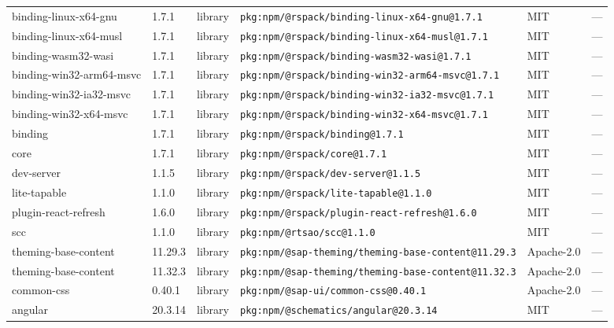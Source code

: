 \documentclass[11pt,a4paper]{article}
\begin{document}
\begin{longtable}{|p{4cm}|p{2cm}|p{1.6cm}|p{5cm}|p{1.5cm}|p{3.5cm}|}
\raggedright binding-linux-x64-gnu & 1.7.1 & library & \small\texttt{pkg:npm/@rspack/binding-linux-x64-gnu@1.7.1} & MIT & \small — \\
\raggedright binding-linux-x64-musl & 1.7.1 & library & \small\texttt{pkg:npm/@rspack/binding-linux-x64-musl@1.7.1} & MIT & \small — \\
\raggedright binding-wasm32-wasi & 1.7.1 & library & \small\texttt{pkg:npm/@rspack/binding-wasm32-wasi@1.7.1} & MIT & \small — \\
\raggedright binding-win32-arm64-msvc & 1.7.1 & library & \small\texttt{pkg:npm/@rspack/binding-win32-arm64-msvc@1.7.1} & MIT & \small — \\
\raggedright binding-win32-ia32-msvc & 1.7.1 & library & \small\texttt{pkg:npm/@rspack/binding-win32-ia32-msvc@1.7.1} & MIT & \small — \\
\raggedright binding-win32-x64-msvc & 1.7.1 & library & \small\texttt{pkg:npm/@rspack/binding-win32-x64-msvc@1.7.1} & MIT & \small — \\
\raggedright binding & 1.7.1 & library & \small\texttt{pkg:npm/@rspack/binding@1.7.1} & MIT & \small — \\
\raggedright core & 1.7.1 & library & \small\texttt{pkg:npm/@rspack/core@1.7.1} & MIT & \small — \\
\raggedright dev-server & 1.1.5 & library & \small\texttt{pkg:npm/@rspack/dev-server@1.1.5} & MIT & \small — \\
\raggedright lite-tapable & 1.1.0 & library & \small\texttt{pkg:npm/@rspack/lite-tapable@1.1.0} & MIT & \small — \\
\raggedright plugin-react-refresh & 1.6.0 & library & \small\texttt{pkg:npm/@rspack/plugin-react-refresh@1.6.0} & MIT & \small — \\
\raggedright scc & 1.1.0 & library & \small\texttt{pkg:npm/@rtsao/scc@1.1.0} & MIT & \small — \\
\raggedright theming-base-content & 11.29.3 & library & \small\texttt{pkg:npm/@sap-theming/theming-base-content@11.29.3} & Apache-2.0 & \small — \\
\raggedright theming-base-content & 11.32.3 & library & \small\texttt{pkg:npm/@sap-theming/theming-base-content@11.32.3} & Apache-2.0 & \small — \\
\raggedright common-css & 0.40.1 & library & \small\texttt{pkg:npm/@sap-ui/common-css@0.40.1} & Apache-2.0 & \small — \\
\raggedright angular & 20.3.14 & library & \small\texttt{pkg:npm/@schematics/angular@20.3.14} & MIT & \small — \\

\end{longtable}
\end{document}
